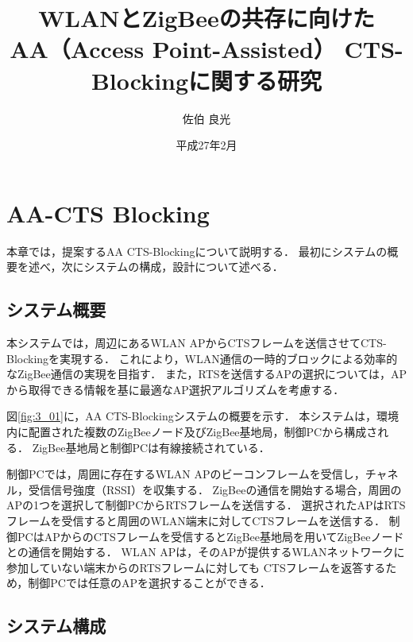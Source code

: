 \documentclass[12pt]{jreport}
\date{平成27年2月}
\title{\fontsize{15.5pt}{25pt}\selectfont WLANとZigBeeの共存に向けた\\AA（Access Point-Assisted） CTS-Blockingに関する研究}
\author{佐伯 良光}
\begin{document}
\maketitle


\chapter{AA-CTS Blocking}\label{implement}%
本章では，提案するAA CTS-Blockingについて説明する．
最初にシステムの概要を述べ，次にシステムの構成，設計について述べる．\\



\section{システム概要}

本システムでは，周辺にあるWLAN APからCTSフレームを送信させてCTS-Blockingを実現する．
これにより，WLAN通信の一時的ブロックによる効率的なZigBee通信の実現を目指す．
また，RTSを送信するAPの選択については，APから取得できる情報を基に最適なAP選択アルゴリズムを考慮する．

図\ref{fig:3_01}に，AA CTS-Blockingシステムの概要を示す．
本システムは，環境内に配置された複数のZigBeeノード及びZigBee基地局，制御PCから構成される．
ZigBee基地局と制御PCは有線接続されている．

制御PCでは，周囲に存在するWLAN APのビーコンフレームを受信し，チャネル，受信信号強度（RSSI）を収集する．
ZigBeeの通信を開始する場合，周囲のAPの1つを選択して制御PCからRTSフレームを送信する．
選択されたAPはRTSフレームを受信すると周囲のWLAN端末に対してCTSフレームを送信する．
制御PCはAPからのCTSフレームを受信するとZigBee基地局を用いてZigBeeノードとの通信を開始する．
WLAN APは，そのAPが提供するWLANネットワークに参加していない端末からのRTSフレームに対しても
CTSフレームを返答するため，制御PCでは任意のAPを選択することができる．

\section{システム構成}
\end{document}

